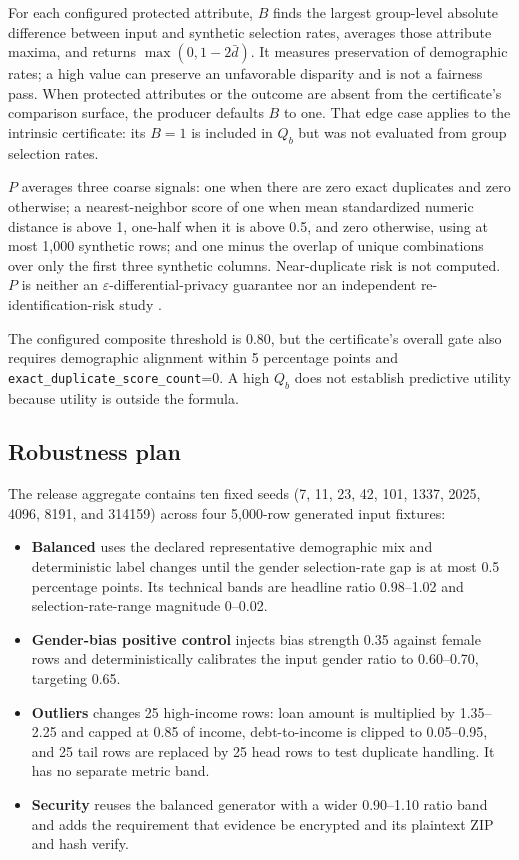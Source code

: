 For each configured protected attribute, $B$ finds the largest group-level absolute difference
between input and synthetic selection rates, averages those attribute maxima, and returns
$\max(0,1-2\bar d)$. It measures preservation of demographic rates; a high value can preserve an
unfavorable disparity and is not a fairness pass. When protected attributes or the outcome are
absent from the certificate's comparison surface, the producer defaults $B$ to one. That edge case
applies to the intrinsic certificate: its $B=1$ is included in $Q_b$ but was not evaluated from
group selection rates.

$P$ averages three coarse signals: one when there are zero exact duplicates and zero otherwise; a
nearest-neighbor score of one when mean standardized numeric distance is above 1, one-half when it
is above 0.5, and zero otherwise, using at most 1,000 synthetic rows; and one minus the overlap of
unique combinations over only the first three synthetic columns. Near-duplicate risk is not
computed. $P$ is neither an $\varepsilon$-differential-privacy guarantee nor an independent
re-identification-risk study \citep{stadler2022synthetic}.

The configured composite threshold is 0.80, but the certificate's overall gate also requires
demographic alignment within 5 percentage points and
\texttt{exact\_duplicate\_score\_count}=0. A high $Q_b$ does not
establish predictive utility because utility is outside the formula.

\subsection{Robustness plan}

The release aggregate contains ten fixed seeds (7, 11, 23, 42, 101, 1337, 2025, 4096, 8191, and
314159) across four 5,000-row generated input fixtures:

\begin{itemize}
  \item \textbf{Balanced} uses the declared representative demographic mix and deterministic label
    changes until the gender selection-rate gap is at most 0.5 percentage points. Its technical
    bands are headline ratio 0.98--1.02 and selection-rate-range magnitude 0--0.02.
  \item \textbf{Gender-bias positive control} injects bias strength 0.35 against female rows and
    deterministically calibrates the input gender ratio to 0.60--0.70, targeting 0.65.
  \item \textbf{Outliers} changes 25 high-income rows: loan amount is multiplied by 1.35--2.25 and
    capped at 0.85 of income, debt-to-income is clipped to 0.05--0.95, and 25 tail rows are replaced
    by 25 head rows to test duplicate handling. It has no separate metric band.
  \item \textbf{Security} reuses the balanced generator with a wider 0.90--1.10 ratio band and adds
    the requirement that evidence be encrypted and its plaintext ZIP and hash verify.
\end{itemize}


